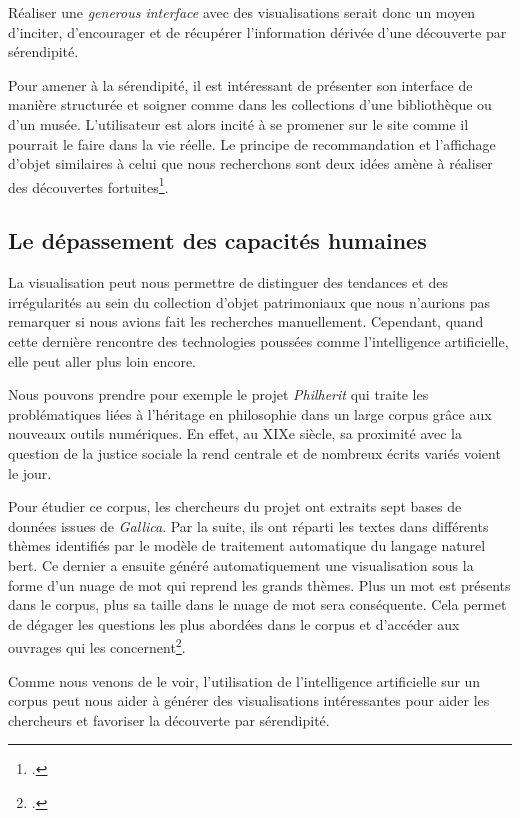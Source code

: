 Réaliser une \textit{generous interface} avec des visualisations serait donc un moyen d'inciter, d'encourager et de récupérer l'information dérivée d'une découverte par sérendipité.

Pour amener à la sérendipité, il est intéressant de présenter son interface de manière structurée et soigner comme dans les collections d'une bibliothèque ou d'un musée. L'utilisateur est alors incité à se promener sur le site comme il pourrait le faire dans la vie réelle. Le principe de recommandation et l'affichage d'objet similaires à celui que nous recherchons sont deux idées amène à réaliser des découvertes fortuites\footcite{windhagerVisualizationCulturalHeritage2019}.


\subsection{Le dépassement des capacités humaines}


La visualisation peut nous permettre de distinguer des tendances et des irrégularités au sein du collection d'objet patrimoniaux que nous n'aurions pas remarquer si nous avions fait les recherches manuellement. Cependant, quand cette dernière rencontre des technologies poussées comme l'intelligence artificielle, elle peut aller plus loin encore.

Nous pouvons prendre pour exemple le projet \textit{Philherit} qui traite les problématiques liées à l'héritage en philosophie dans un large corpus grâce aux nouveaux outils numériques. En effet, au XIXe siècle, sa proximité avec la question de la justice sociale la rend centrale et de nombreux écrits variés voient le jour. 

Pour étudier ce corpus, les chercheurs du projet ont extraits sept bases de données issues de \textit{Gallica}. Par la suite, ils ont réparti les textes dans différents thèmes identifiés par le modèle de traitement automatique du langage naturel \gls{bert}. Ce dernier a ensuite généré automatiquement une visualisation sous la forme d'un nuage de mot qui reprend les grands thèmes. Plus un mot est présents dans le corpus, plus sa taille dans le nuage de mot sera conséquente. Cela permet de dégager les questions les plus abordées dans le corpus et d'accéder aux ouvrages qui les concernent\footcite{griveauVisualisationDonneesAu2025}.

Comme nous venons de le voir, l'utilisation de l'intelligence artificielle sur un corpus peut nous aider à générer des visualisations intéressantes pour aider les chercheurs et favoriser la découverte par sérendipité. 